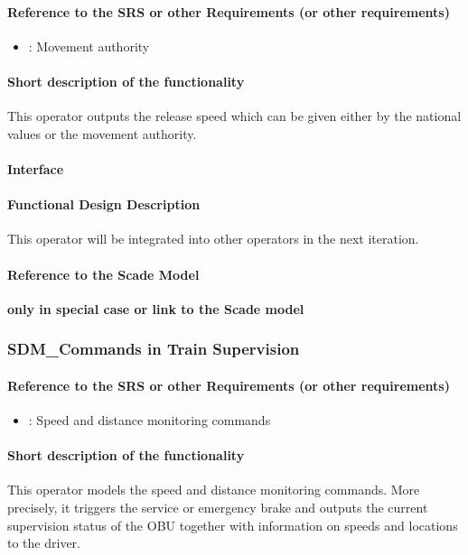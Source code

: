 \paragraph{Reference to the SRS or other Requirements (or other requirements)}
\begin{itemize}
	\item \cite[Chapt.~3.8]{subset-026}: Movement authority 
\end{itemize}
\paragraph{Short description of the functionality}
This operator outputs the release speed which can be given either by the national values or the movement authority.
\paragraph{Interface}
\paragraph{Functional Design Description}
This operator will be integrated into other operators in the next iteration.
\paragraph{Reference to the Scade Model}
\textbf{only in special case or link to the Scade model}

\subsubsection{SDM\_Commands in Train Supervision}
\paragraph{Reference to the SRS or other Requirements (or other requirements)}
\begin{itemize}
	\item \cite[Chapt.~3.13.10]{subset-026}: Speed and distance monitoring commands 
\end{itemize}
\paragraph{Short description of the functionality}
This operator models the speed and distance monitoring commands. More precisely, it triggers the service or emergency brake and outputs the current supervision status of the OBU together with information on speeds and locations to the driver.

